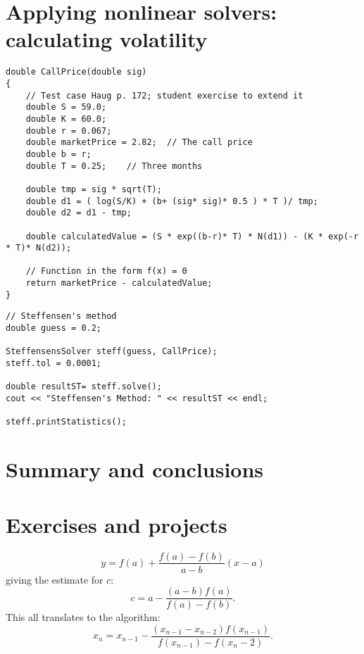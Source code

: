 \section{Applying nonlinear solvers: calculating volatility}

\begin{lstlisting}
double CallPrice(double sig)
{
	// Test case Haug p. 172; student exercise to extend it
	double S = 59.0;
	double K = 60.0;
	double r = 0.067;
	double marketPrice = 2.82;	// The call price
	double b = r;
	double T = 0.25;	// Three months

	double tmp = sig * sqrt(T);
	double d1 = ( log(S/K) + (b+ (sig* sig)* 0.5 ) * T )/ tmp;
	double d2 = d1 - tmp;

	double calculatedValue = (S * exp((b-r)* T) * N(d1)) - (K * exp(-r * T)* N(d2));

	// Function in the form f(x) = 0
	return marketPrice - calculatedValue;
}
\end{lstlisting}

\begin{lstlisting}
// Steffensen's method
double guess = 0.2;

SteffensensSolver steff(guess, CallPrice);
steff.tol = 0.0001;

double resultST= steff.solve();
cout << "Steffensen's Method: " << resultST << endl;

steff.printStatistics();
\end{lstlisting}

\section{Summary and conclusions}

\section{Exercises and projects}

\[ y=f\left(a\right)+\frac{f\left(a\right)-f\left(b\right)}{a-b}\left(x-a\right) \] giving the estimate for $c$: \[ c = a - \frac{\left(a-b\right)f\left(a\right)}{f\left(a\right)-f\left(b\right)}. \] This all translates to the algorithm: \[ x_{n}=x_{n-1}-\frac{\left(x_{n-1}-x_{n-2}\right)f\left(x_{n-1}\right)}{f\left(x_{n-1}\right)-f\left(x_{n}-2\right)}. \]